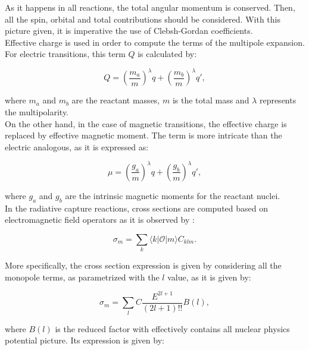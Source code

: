 \documentclass[openany]{book}
\begin{document}
As it happens in all reactions, the total angular momentum is conserved. Then, all the spin, orbital and total  contributions should be considered. With this picture given, it is imperative the use of Clebsh-Gordan coefficients. \\

Effective charge is used in order to compute the terms of the multipole expansion. For electric transitions, this term $Q$ is calculated by:

\begin{equation} \label{eq:radiativeCapture_Electric_charge}
	Q =  \left(\frac{m_a}{m}\right)^{\lambda}q + \left(\frac{m_b}{m}\right)^{\lambda}q',
\end{equation}

where $m_a$ and $m_b$ are the reactant masses, $m$ is the total mass and $\lambda$ represents the multipolarity. \\

On the other hand, in the case of magnetic transitions, the effective charge is replaced by effective magnetic moment.
The term is more intricate than the electric analogous, as it is expressed as: 

\begin{equation} \label{eq:radiativeCapture_Magnetic_moment}
	\mu =  \left(\frac{g_a}{m}\right)^{\lambda}q + \left(\frac{g_b}{m}\right)^{\lambda}q',
\end{equation}

where $g_a$ and $g_b$ are the intrinsic magnetic moments for the reactant nuclei. \\

In the radiative capture reactions, cross sections are computed based on electromagnetic field operators as it is observed by \cite{huang_bertulani_guimaraes_2010}: 

\begin{equation}  \label{eq:radiativeCapture_crossSection}
	\sigma_m = \sum_{k}{\langle k | \mathcal{O} | m \rangle} C_{klm}.		
\end{equation}

More specifically, the cross section expression is given by considering all the monopole terms, as parametrized with the $l$ value, as it is given by: 

\begin{equation}  \label{eq:radiativeCapture_crossSection_l}
	\sigma_m = \sum_{l} C \frac{E^{2l +1}}{(2l+1)!!} B(l), 		
\end{equation}

where $B(l)$ is the reduced factor with effectively contains all nuclear physics potential picture. Its expression is given by:
\end{document}
